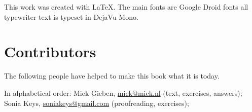 This work was created with \LaTeX. The main fonts are Google Droid fonts all
typewriter text is typeset in DejaVu Mono.

\section{Contributors}
The following people have helped to make this book what it is today.

In alphabetical order:
\noindent
Miek Gieben, \url{miek@miek.nl} (text, exercises, answers);
Sonia Keys, \url{soniakeys@gmail.com} (proofreading, exercises); 
